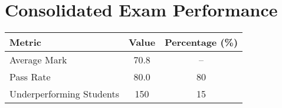 \documentclass[a4paper,12pt]{article}
\begin{document}
\section*{Consolidated Exam Performance}
\begin{tabular}{l S[table-format=2.1] c}
    \toprule
    \textbf{Metric} & \textbf{Value} & \textbf{Percentage (\%)} \\
    \midrule
    Average Mark & 70.8 & -- \\
    Pass Rate & 80.0 & 80 \\
    Underperforming Students & 150 & 15 \\
    \bottomrule
\end{tabular}
\end{document}
